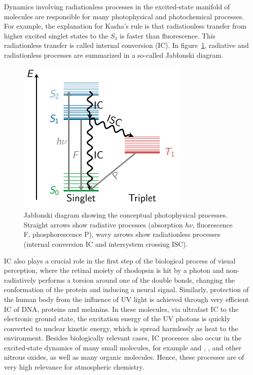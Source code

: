 \documentclass[a4paper,11pt,DIV=15,openany,twoside=false]{scrbook}
\begin{document}
Dynamics involving radiationless processes in the excited-state manifold of molecules are responsible for many photophysical and photochemical processes. For example, the explanation for Kasha's rule \cite{Kasha1950DFS} is that radiationless transfer from higher excited singlet states to the $S_1$ is faster than fluorescence. This radiationless transfer is called internal conversion (IC). In figure~\ref{fig:jablonski}, radiative and radiationless processes are summarized in a so-called Jab{\l}onski diagram.

\begin{figure}[h]
  \centering
  \includegraphics[scale=1.6]{img/jablonski/jablonski.pdf}
  \caption{Jab{\l}onski diagram showing the conceptual photophysical processes. Straight arrows show radiative processes (absorption $h\nu$, fluorescence F, phosphorescence P), wavy arrows show radiationless processes (internal conversion IC and intersystem crossing ISC). }
  \label{fig:jablonski}
\end{figure}

IC also plays a crucial role in the first step of the biological process of visual perception, where the retinal moiety of rhodopsin is hit by a photon and non-radiatively performs a torsion around one of the double bonds, changing the conformation of the protein and inducing a neural signal.
Similarly, protection of the human body from the influence of UV light is achieved through very efficient IC of DNA, proteins and melanins. In these molecules, via ultrafast IC to the electronic ground state, the excitation energy of the UV photons is quickly converted to nuclear kinetic energy, which is spread harmlessly as heat to the environment.
Besides biologically relevant cases, IC processes also occur in the excited-state dynamics of many small molecules, for example  and , ,  and other nitrous oxides, as well as many organic molecules. Hence, these processes are of very high relevance for atmospheric chemistry.
\end{document}
